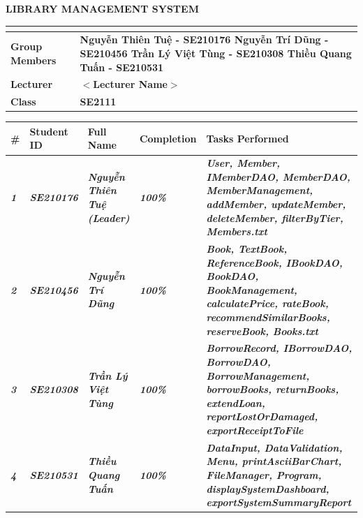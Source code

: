 \documentclass[12pt,a4paper]{article}
\begin{document}
\begin{center}
    {\fontsize{24}{28}\selectfont\bfseries LIBRARY MANAGEMENT SYSTEM\par}
\end{center}
\vspace{0.3cm}

\renewcommand{\arraystretch}{1.6}
\begin{tabular}{|>{\raggedleft\arraybackslash\bfseries}p{4.2cm}|>{\bfseries}p{10.8cm}|}
    \hline
    \multicolumn{2}{|c|}{\rule{0pt}{0.7cm}\fontsize{15}{18}\selectfont\bfseries Group: Group 4} \\[0.2cm]
    \hline
    Group Members &
    Nguyễn Thiên Tuệ - SE210176 \newline
    Nguyễn Trí Dũng - SE210456 \newline
    Trần Lý Việt Tùng - SE210308 \newline
    Thiều Quang Tuấn - SE210531 \\
    \hline
    Lecturer & $<$Lecturer Name$>$ \\
    \hline
    Class & SE2111 \\
    \hline
\end{tabular}

\vspace{0.6cm}

\renewcommand{\arraystretch}{1.5}
\begin{tabular}{|p{0.6cm}|p{2.3cm}|p{3.2cm}|p{2.3cm}|p{5.6cm}|}
    \hline
    \textbf{\#} &
    \textcolor{wordblue}{\textbf{Student ID}} &
    \textcolor{wordblue}{\textbf{Full Name}} &
    \textcolor{wordblue}{\textbf{Completion}} &
    \textcolor{wordblue}{\textbf{Tasks Performed}} \\
    \hline
    \textbf{\textit{1}} &
    \textbf{\textit{SE210176}} &
    \textbf{\textit{Nguyễn Thiên Tuệ (Leader)}} &
    \textbf{\textit{100\%}} &
    \textbf{\textit{User, Member, IMemberDAO, MemberDAO, MemberManagement, addMember, updateMember, deleteMember, filterByTier, Members.txt}} \\
    \hline
    \textbf{\textit{2}} &
    \textbf{\textit{SE210456}} &
    \textbf{\textit{Nguyễn Trí Dũng}} &
    \textbf{\textit{100\%}} &
    \textbf{\textit{Book, TextBook, ReferenceBook, IBookDAO, BookDAO, BookManagement, calculatePrice, rateBook, recommendSimilarBooks, reserveBook, Books.txt}} \\
    \hline
    \textbf{\textit{3}} &
    \textbf{\textit{SE210308}} &
    \textbf{\textit{Trần Lý Việt Tùng}} &
    \textbf{\textit{100\%}} &
    \textbf{\textit{BorrowRecord, IBorrowDAO, BorrowDAO, BorrowManagement, borrowBooks, returnBooks, extendLoan, reportLostOrDamaged, exportReceiptToFile}} \\
    \hline
    \textbf{\textit{4}} &
    \textbf{\textit{SE210531}} &
    \textbf{\textit{Thiều Quang Tuấn}} &
    \textbf{\textit{100\%}} &
    \textbf{\textit{DataInput, DataValidation, Menu, printAsciiBarChart, FileManager, Program, displaySystemDashboard, exportSystemSummaryReport}} \\
    \hline
\end{tabular}
\end{document}
